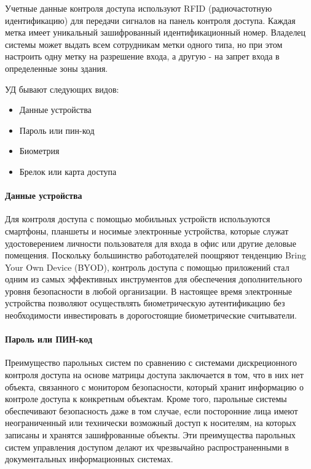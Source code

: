 Учетные данные контроля доступа используют RFID (радиочастотную идентификацию) для передачи сигналов на панель контроля доступа. Каждая метка имеет уникальный зашифрованный идентификационный номер. Владелец системы может выдать всем сотрудникам метки одного типа, но при этом настроить одну метку на разрешение входа, а другую - на запрет входа в определенные зоны здания.

УД бывают следующих видов:

\begin{itemize}
	\item Данные устройства
	\item Пароль или пин-код
	\item Биометрия
	\item Брелок или карта доступа
\end{itemize}

\paragraph{Данные устройства}

Для контроля доступа с помощью мобильных устройств используются смартфоны, планшеты и носимые электронные устройства, которые служат удостоверением личности пользователя для входа в офис или другие деловые помещения. Поскольку большинство работодателей поощряют тенденцию Bring Your Own Device (BYOD), контроль доступа с помощью приложений стал одним из самых эффективных инструментов для обеспечения дополнительного уровня безопасности в любой организации. В настоящее время электронные устройства позволяют осуществлять биометрическую аутентификацию без необходимости инвестировать в дорогостоящие биометрические считыватели.

\paragraph{Пароль или ПИН-код}

Преимущество парольных систем по сравнению с системами дискреционного контроля доступа на основе матрицы доступа заключается в том, что в них нет объекта, связанного с монитором безопасности, который хранит информацию о контроле доступа к конкретным объектам. Кроме того, парольные системы обеспечивают безопасность даже в том случае, если посторонние лица имеют неограниченный или технически возможный доступ к носителям, на которых записаны и хранятся зашифрованные объекты. Эти преимущества парольных систем управления доступом делают их чрезвычайно распространенными в документальных информационных системах.

